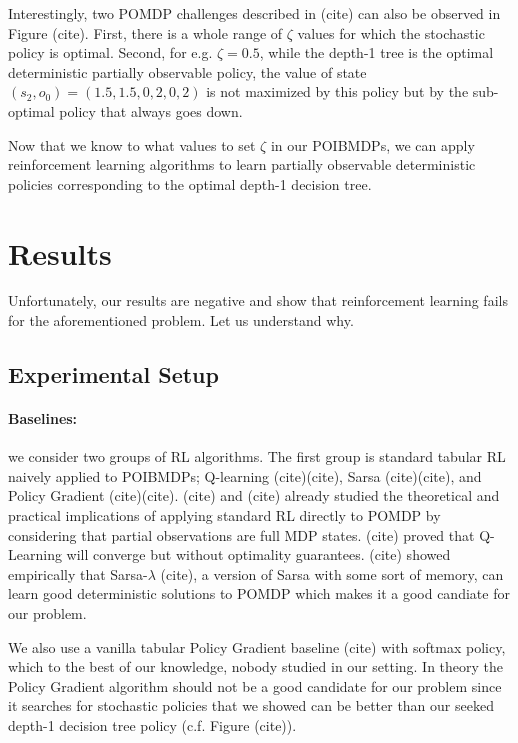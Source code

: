 Interestingly, two POMDP challenges described in (cite) can also be observed in Figure (cite). 
First, there is a whole range of $\zeta$ values for which the stochastic policy is optimal.
Second, for e.g. $\zeta=0.5$, while the depth-1 tree is the optimal deterministic partially observable policy, the value of state $(s_2, o_0) = (1.5, 1.5, 0, 2, 0, 2)$ is not maximized by this policy but by the sub-optimal policy that always goes down.

Now that we know to what values to set $\zeta$ in our POIBMDPs, we can apply reinforcement learning algorithms to learn partially observable deterministic policies corresponding to the optimal depth-1 decision tree.

\section{Results}

Unfortunately, our results are negative and show that reinforcement learning fails for the aforementioned problem. Let us understand why.

\subsection{Experimental Setup}

\paragraph{Baselines:} we consider two groups of RL algorithms. The first group is standard tabular RL naively applied to POIBMDPs; Q-learning (cite)(cite), Sarsa (cite)(cite), and Policy Gradient (cite)(cite).
(cite) and (cite) already studied the theoretical and practical implications of applying standard RL directly to POMDP by considering that partial observations are full MDP states.
(cite) proved that Q-Learning will converge but without optimality guarantees. 
(cite) showed empirically that Sarsa-$\lambda$ (cite), a version of Sarsa with some sort of memory, can learn good deterministic solutions to POMDP which makes it a good candiate for our problem.

We also use a vanilla tabular Policy Gradient baseline (cite) with softmax policy, which to the best of our knowledge, nobody studied in our setting.
In theory the Policy Gradient algorithm should not be a good candidate for our problem since it searches for stochastic policies that we showed can be better than our seeked depth-1 decision tree policy (c.f. Figure (cite)).

